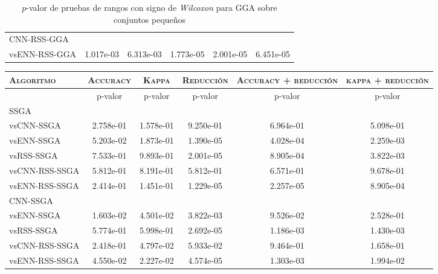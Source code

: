 \begin{table}[h!]
\begin{adjustbox}{max width =\textwidth}
\begin{tabular}{l c c c c c}
\hline

CNN-RSS-GGA\\
vsENN-RSS-GGA & 1.017e-03 & 6.313e-03 & 1.773e-05 & 2.001e-05 & 6.451e-05 \\ 
 
\hline

\end{tabular}
\end{adjustbox}
\caption[Pruebas de \emph{Wilcoxon} entre GGA y variaciones para conjuntos pequeños]{$p$-valor de pruebas de rangos con signo de \emph{Wilcoxon} para GGA sobre conjuntos pequeños}
\label{wilcox-gga-peq}
\end{table}

\begin{table}[h!]
\centering
\begin{adjustbox}{max width =\textwidth}
\begin{tabular}{l c c c c c}
\hline
	\textsc{Algoritmo}
	& \multicolumn{1}{c}{\textsc{Accuracy}}
	& \multicolumn{1}{c}{\textsc{Kappa}}
	& \multicolumn{1}{c}{\textsc{Reducción}} 
	& \multicolumn{1}{c}{\textsc{Accuracy + reducción}} 
	& \multicolumn{1}{c}{\textsc{kappa + reducción}} \\

\hline
\hline

 & p-valor & p-valor & p-valor & p-valor & p-valor \\

SSGA\\
vsCNN-SSGA  & 2.758e-01 & 1.578e-01 & 9.250e-01 & 6.964e-01 & 5.098e-01 \\    
vsENN-SSGA   & 5.203e-02 & 1.873e-01 & 1.390e-05 & 4.028e-04 & 2.259e-03 \\ 
vsRSS-SSGA     & 7.533e-01 & 9.893e-01 & 2.001e-05 & 8.905e-04 & 3.822e-03 \\
vsCNN-RSS-SSGA & 5.812e-01 & 8.191e-01 & 5.812e-01 & 6.571e-01 & 9.678e-01 \\
vsENN-RSS-SSGA & 2.414e-01 & 1.451e-01 & 1.229e-05 & 2.257e-05 & 8.905e-04 \\

\hline

CNN-SSGA\\
vsENN-SSGA & 1.603e-02 & 4.501e-02 & 3.822e-03 & 9.526e-02 & 2.528e-01 \\ 
vsRSS-SSGA & 5.774e-01 & 5.998e-01 & 2.692e-05 & 1.186e-03 & 1.430e-03 \\
vsCNN-RSS-SSGA & 2.418e-01 & 4.797e-02 & 5.933e-02 & 9.464e-01 & 1.658e-01 \\
vsENN-RSS-SSGA & 4.550e-02 & 2.227e-02 & 4.574e-05 & 1.303e-03 & 1.994e-02 \\


\end{tabular}
\end{adjustbox}
\end{table}
